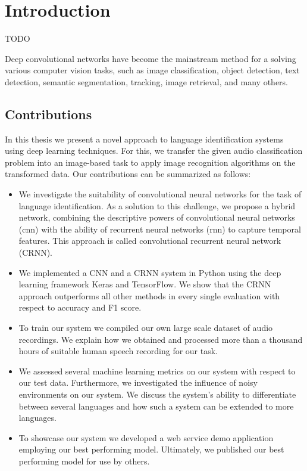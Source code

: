 \section{Introduction}

TODO

Deep convolutional networks have become the mainstream method for a solving various computer vision tasks, such as image classification\cite{russakovsky2015imagenet}, object detection\cite{russakovsky2015imagenet, everingham2010pascal}, text detection\cite{Yang2016SceneTextRegAR, jaderberg2014synthetic}, semantic segmentation\cite{dai2016instance, girshick2014rich}, tracking\cite{nam2016learning}, image retrieval\cite{tolias2015particular}, and many others.

\subsection{Contributions}
In this thesis we present a novel approach to language identification systems using deep learning techniques. For this, we transfer the given audio classification problem into an image-based task to apply image recognition algorithms on the transformed data. Our contributions can be summarized as follows:
\begin{itemize}
	\item We investigate the suitability of convolutional neural networks for the task of language identification. As a solution to this challenge, we propose a hybrid network, combining the descriptive powers of convolutional neural networks (\ac{cnn}) with the ability of recurrent neural networks (\ac{rnn}) to capture temporal features. This approach is called convolutional recurrent neural network (CRNN). 
	\item We implemented a CNN and a CRNN system in Python using the deep learning framework Keras and TensorFlow. We show that the CRNN approach outperforms all other methods in every single evaluation with respect to accuracy and F1 score.
	\item To train our system we compiled our own large scale dataset of audio recordings. We explain how we obtained and processed more than a thousand hours of suitable human speech recording for our task.
	\item We assessed several machine learning metrics on our system with respect to our test data. Furthermore, we investigated the influence of noisy environments on our system. We discuss the system's ability to differentiate between several languages and how such a system can be extended to more languages.
	\item To showcase our system we developed a web service demo application employing our best performing model. Ultimately, we published our best performing model for use by others.
\end{itemize} 


